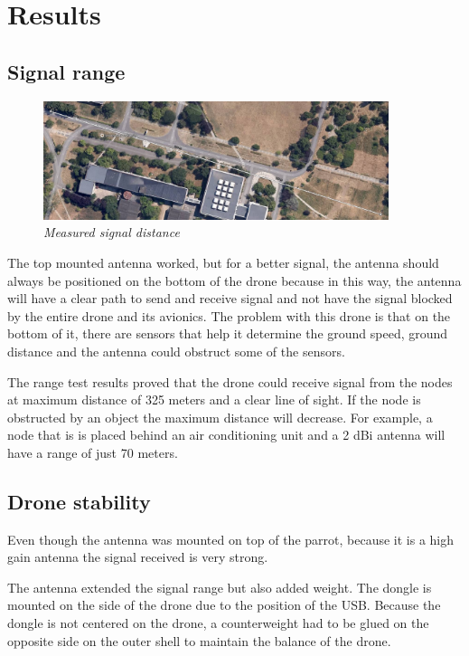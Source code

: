 \section{Results}


\subsection{Signal range}

\begin{figure}[ht]
\begin{center}
\includegraphics[width=0.9\textwidth]{img/distance.png}
\end{center}
\caption{\small \itshape{Measured signal distance}}
\end{figure}


The top mounted antenna worked, but for a better signal, the antenna should always be positioned on the bottom of the drone because in this way, the antenna will have a clear path to send and receive signal and not have the signal blocked by the entire drone and its avionics. The problem with this drone is that on the bottom of it, there are sensors that help it determine the ground speed, ground distance and the antenna could obstruct some of the sensors.

The range test results proved that the drone could receive signal from the nodes at maximum distance of 325 meters and a clear line of sight. If the node is obstructed by an object the maximum distance will decrease. For example, a node that is is placed behind an air conditioning unit and a 2 dBi antenna will have a range of just 70 meters.


\subsection{Drone stability}

Even though the antenna was mounted on top of the parrot, because it is a high gain antenna the signal received is very strong. 

The antenna extended the signal range but also added weight. The dongle is mounted on the side of the drone due to the position of the USB. Because the dongle is not centered on the drone, a counterweight had to be glued on the opposite side on the outer shell to maintain the balance of the drone. 

